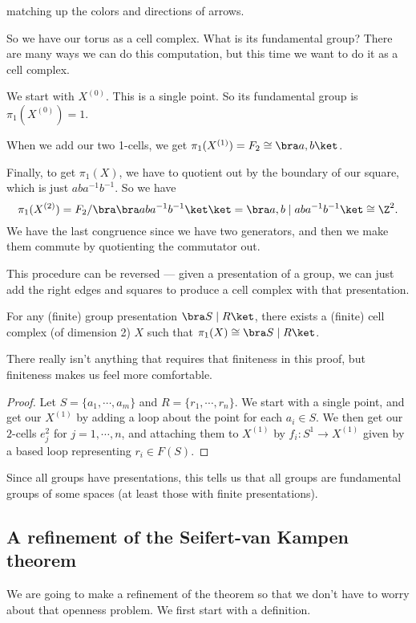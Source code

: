 \documentclass[a4paper]{article}
\begin{document}
\begin{eg}
\begin{center}
  \end{center}
  matching up the colors and directions of arrows.

  So we have our torus as a cell complex. What is its fundamental group? There are many ways we can do this computation, but this time we want to do it as a cell complex.

  We start with $X^{(0)}$. This is a single point. So its fundamental group is $\pi_1(X^{(0)}) = 1$.

  When we add our two 1-cells, we get $\pi_1(X^{(1)}) = F_2 \cong \bra a, b\ket$.

  Finally, to get $\pi_1(X)$, we have to quotient out by the boundary of our square, which is just $aba^{-1}b^{-1}$. So we have
  \[
    \pi_1(X^{(2)}) = F_2/\bra \bra aba^{-1}b^{-1}\ket\ket = \bra a, b \mid aba^{-1}b^{-1}\ket \cong \Z^2.
  \]
  We have the last congruence since we have two generators, and then we make them commute by quotienting the commutator out.
\end{eg}
This procedure can be reversed --- given a presentation of a group, we can just add the right edges and squares to produce a cell complex with that presentation.

\begin{cor}
  For any (finite) group presentation $\bra S\mid R\ket$, there exists a (finite) cell complex (of dimension 2) $X$ such that $\pi_1(X) \cong \bra S\mid R \ket$.
\end{cor}
There really isn't anything that requires that finiteness in this proof, but finiteness makes us feel more comfortable.

\begin{proof}
  Let $S = \{a_1, \cdots, a_m\}$ and $R = \{r_1, \cdots, r_n\}$. We start with a single point, and get our $X^{(1)}$ by adding a loop about the point for each $a_i \in S$. We then get our $2$-cells $e_j^2$ for $j = 1, \cdots, n$, and attaching them to $X^{(1)}$ by $f_i: S^1 \to X^{(1)}$ given by a based loop representing $r_i \in F(S)$.
\end{proof}
Since all groups have presentations, this tells us that all groups are fundamental groups of some spaces (at least those with finite presentations).

\subsection{A refinement of the Seifert-van Kampen theorem}
We are going to make a refinement of the theorem so that we don't have to worry about that openness problem. We first start with a definition.
\end{document}
